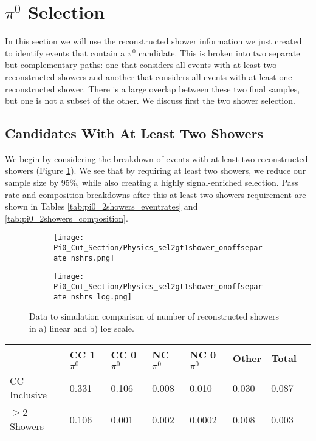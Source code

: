 \clearpage
\section{$\pi^0$ Selection} 

In this section we will use the reconstructed shower information we just created to identify events that contain a $\pi^0$ candidate. This is broken into two separate but complementary paths: one that considers all events with at least two reconstructed showers and another that considers all events with at least one reconstructed shower. There is a large overlap between these two final samples, but one is not a subset of the other. We discuss first the two shower selection.  

\subsection{Candidates With At Least Two Showers}
We begin by considering the breakdown of events with at least two reconstructed showers (Figure \ref{fig:physics_pi0_nshrs}).  We see that by requiring at least two showers, we reduce our sample size by 95\%, while also creating a highly signal-enriched selection. Pass rate and composition breakdowns after this at-least-two-showers requirement are shown in Tables \ref{tab:pi0_2showers_eventrates} and \ref{tab:pi0_2showers_composition}. 

\begin{figure}[H]
\centering
  \begin{subfigure}[t]{0.3\textwidth}
    \centering
\texttt{[image: Pi0\_Cut\_Section/Physics\_sel2gt1shower\_onoffseparate\_nshrs.png]}
  \caption{ }
  \end{subfigure} 
  \hspace{30mm}
  \begin{subfigure}[t]{0.3\textwidth}
    \centering
    \texttt{[image: Pi0\_Cut\_Section/Physics\_sel2gt1shower\_onoffseparate\_nshrs\_log.png]}
  \caption{ }
  \end{subfigure} 
\caption{ Data to simulation comparison of number of reconstructed showers in a) linear and b) log scale. }
\label{fig:physics_pi0_nshrs}
\end{figure}

\begin{table}[H]
\centering
{}
 \begin{tabular}{| l | l | l |l|l|l|l|l|}
 \hline
 & CC 1$\pi^0$ & CC 0$\pi^0$ & NC $\pi^0$ & NC 0$\pi^0$ & Other & Total \\ [0.1ex] \hline
CC Inclusive & 0.331 & 0.106 & 0.008 & 0.010 & 0.030 & 0.087 \\
$\geq$2 Showers & 0.106 & 0.001 & 0.002 & 0.0002 & 0.008 & 0.003 \\ \hline
\end{tabular}
\end{table}

